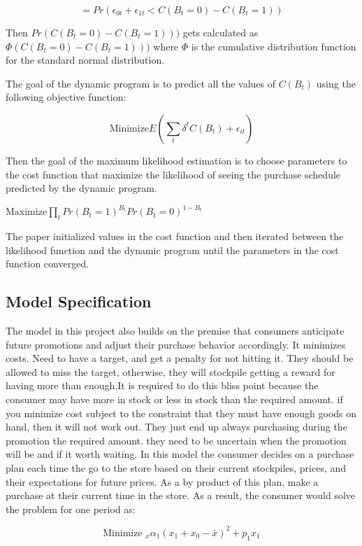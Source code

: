 \documentclass{article}
\begin{document}
$$=  Pr(  \epsilon_{0t} + \epsilon_{1t} < C(B_t = 0) - C(B_t = 1) )   $$

Then $Pr(C(B_t = 0) - C(B_t = 1) ) )$ gets calculated as $\Phi(C(B_t = 0) - C(B_t = 1) ) )$ where $\Phi$ is the cumulative distribution function for the standard normal distribution.

The goal of the dynamic program is to predict all the values of $C(B_t)$ using the following objective function:

$$\text{Minimize} E( \sum_t \delta^{t} C(B_t) + \epsilon_{it} )$$

Then the goal of the maximum likelihood estimation is to choose parameters to the cost function that maximize the likelihood of seeing the purchase schedule predicted by the dynamic program. 

$\text{Maximize} \prod_{t} Pr({B_t= 1})^{B_t} Pr(B_t=0)^{1-B_t} $

The paper initialized values in the cost function and then iterated between the likelihood function and the dynamic program until the parameters in the cost function converged.

\subsection{Model Specification}

The model in this project also builds on the premise that consumers anticipate future promotions and adjust their purchase behavior accordingly. It minimizes costs. Need to have a target, and get a penalty for not hitting it. They should be allowed to miss the target, otherwise, they will stockpile getting a reward for having more than enough.It is required to do this bliss point because the consumer may have more in stock or less in stock than the required amount. if you minimize cost subject to the constraint that they must have enough goods on hand, then it will not work out. They just end up always purchasing during the promotion the required amount. they need to be uncertain when the promotion will be and if it worth waiting. In this model the consumer decides on a purchase plan each time the go to the store based on their current stockpiles, prices, and their expectations for future prices. As a by product of this plan, make a purchase at their current time in the store. As a result, the consumer would solve the problem for one period as:

$$ \text{Minimize }_{x}  \alpha_1 (x_1 +x_0 - \bar{x})^2 + p_1 x_1 $$
\end{document}

